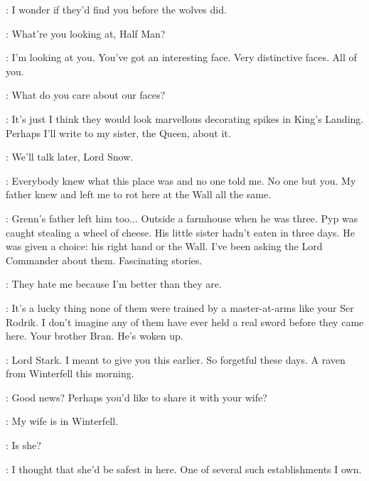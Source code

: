 \PYP: I wonder if they'd find you before the wolves did. 

\GRENN:  What're you looking at, Half Man? 

\TYRION: I'm looking at you. You've got an interesting face. Very distinctive faces. All of you. 

\RAST: What do you care about our faces? 

\TYRION: It's just I think they would look marvellous decorating
spikes in King's Landing. Perhaps I'll write to my sister, the Queen, about it. 

\GRENN: We'll talk later, Lord Snow. 


\JON: Everybody knew what this place was and no one told me. No one but you. My father knew and left me to rot here at the Wall all the same. 

\TYRION: Grenn's father left him too$\ldots$ Outside a farmhouse when he was three. Pyp was caught stealing a wheel of cheese. His little sister hadn't eaten in three days. He was given a choice: his right hand or the Wall. I've been asking the Lord Commander about them. Fascinating stories. 

\JON: They hate me because I'm better than they are. 

\TYRION: It's a lucky thing none of them were trained by a master-at-arms like your Ser Rodrik. I don't imagine any of them have ever held a real sword before they came here. Your brother Bran. He's woken up. 


\scene



\PYCELLE: Lord Stark. I meant to give you this earlier. So forgetful these days. A raven from Winterfell this morning. 


\LITTLEFINGER: Good news? Perhaps you'd like to share it with your wife? 

\NED: My wife is in Winterfell. 

\LITTLEFINGER: Is she? 


\LITTLEFINGER: I thought that she'd be safest in here. One of several such establishments I own. 

